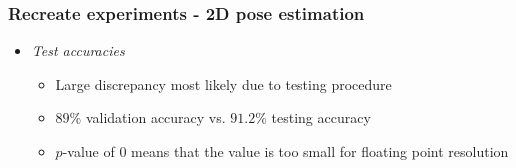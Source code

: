 \documentclass[9pt]{beamer}
\renewcommand{\caption}[1]{\\ \footnotesize{\captiongrey{#1}}}
\newenvironment{myframe}[1][]{%
\begin{frame}%
\frametitle{#1}
\setcounter{footnote}{0}


}{%
\end{frame}%
}
\begin{document}
\begin{myframe}[Recreate experiments - 2D pose estimation]
    \begin{itemize}
        \item \textit{Test accuracies}
        \begin{itemize}
            \item Large discrepancy most likely due to testing procedure
            \item $89\%$ validation accuracy vs. $91.2\%$ testing accuracy
            \item $p$-value of $0$ means that the value is too small for floating point resolution
        \end{itemize}
    \end{itemize}
    \begin{table}[]
        \centering
    \end{table}
\end{myframe}


\end{document}
